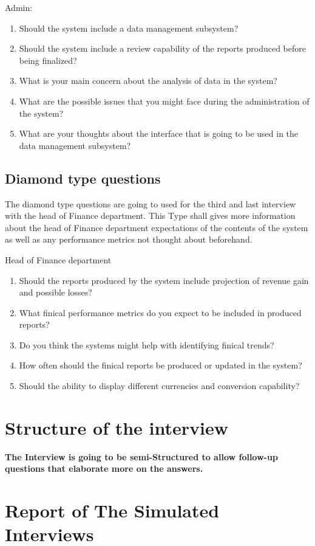 \documentclass{article}
\begin{document}
Admin:
\begin{enumerate}
    \item Should the system include a data management subsystem?
    \item Should the system include a review capability of the reports produced before being finalized?
    \item What is your main concern about the analysis of data in the system?
    \item What are the possible issues that you might face during the administration of the system?
    \item What are your thoughts about the interface that is going to be used in the data management subsystem?
\end{enumerate}
\subsection{Diamond type questions}
The diamond type questions are going to used for the third and last interview with the head of Finance department. This Type shall gives more information about the head of Finance department expectations of the contents of the system as well as any performance metrics not thought about beforehand.

Head of Finance department
\begin{enumerate}
    \item Should the reports produced by the system include projection of revenue gain and possible losses?
    \item What finical performance metrics do you expect to be included in produced reports?
    \item Do you think the systems might help with identifying finical trends?
    \item How often should the finical reports be produced or updated in the system?
    \item Should the ability to display different currencies and conversion capability?
\end{enumerate}

\section{Structure of the interview}
\textbf{The Interview is going to be semi-Structured to allow follow-up questions that elaborate more on the answers.}

\section{Report of The Simulated Interviews}
\end{document}

